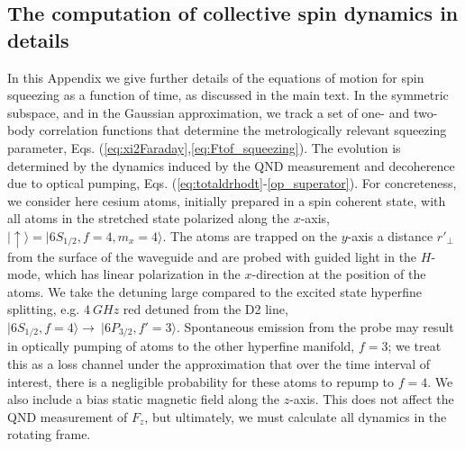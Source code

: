 \documentclass[preprint,aps,pra,onecolumn,superscriptaddress]{revtex4-1} %
\def\ket#1{\lvert{#1}\rangle}%
\begin{document}
\begin{appendix}
\section{The computation of collective spin dynamics in details}\label{Sec::opticalpumpinginrotatingframe}
In this Appendix we give further details of the equations of motion for spin squeezing as a function of time, as discussed in the main text.  In the symmetric subspace, and in the Gaussian approximation, we track a set of one- and two-body correlation functions that determine the metrologically relevant squeezing parameter, Eqs. (\ref{eq:xi2Faraday},\ref{eq:Ftof_squeezing}).   The evolution is determined by the dynamics induced by the QND measurement and decoherence due to optical pumping, Eqs. (\ref{eq:totaldrhodt}-\ref{op_superator}).   For concreteness, we consider here cesium atoms,  initially prepared in a spin coherent state, with all atoms in the stretched state polarized along the $x$-axis, $\ket{\uparrow} = \ket{6S_{1/2}, f=4, m_x=4}$.  The atoms are trapped on the $y$-axis a distance $r'_\perp$ from the surface of the waveguide and are probed with guided light in the $H$-mode, which has linear polarization in the $x$-direction at the position of the atoms.   We take the detuning large compared to the excited state hyperfine splitting, e.g. $\SI{4}{GHz}$ red detuned from the D2 line,  $\ket{6S_{1/2}, f=4}\rightarrow \ \ket{6P_{3/2},f'=3}$.   Spontaneous emission from the probe may result in optically pumping of atoms to the other  hyperfine manifold, $f=3$; we treat this as a loss channel under the approximation that over the time interval of interest, there is a negligible probability for these atoms to repump to $f=4$.  We also include a bias static magnetic field along the $z$-axis.  This does not affect the QND measurement of $F_z$, but ultimately, we must  calculate all dynamics in the rotating frame.


\end{appendix}
\end{document}
